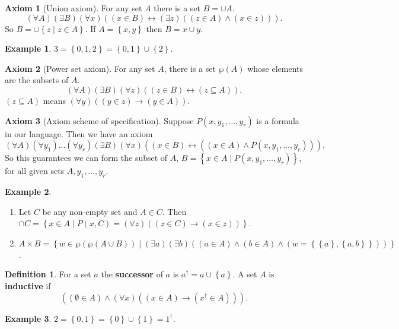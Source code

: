 \documentclass{article}
\newcommand{\rb}[1]{\left( #1 \right)}
\newcommand{\cb}[1]{\left\{ #1 \right\}}
\newcommand{\andb}[2]{\rb{#1 \land #2}}
\newcommand{\impb}[2]{\rb{#1 \rightarrow #2}}
\newcommand{\iffb}[2]{\rb{#1 \leftrightarrow #2}}
\newcommand{\fab}[1]{\rb{\forall #1}}
\newcommand{\teb}[1]{\rb{\exists #1}}
\newcommand{\eqb}[2]{\rb{#1 = #2}}
\newcommand{\inb}[2]{\rb{#1 \in #2}}
\newcommand{\subb}[2]{\rb{#1 \subseteq #2}}
\theoremstyle{definition}\newtheorem{definition}{Definition}[subsection]
\theoremstyle{definition}\newtheorem{remark}[definition]{Remark}
\theoremstyle{definition}\newtheorem*{example}{Example}
\theoremstyle{definition}\newtheorem*{note}{Note}
\newtheorem{axiom}{Axiom}
\begin{document}
\begin{axiom}[Union axiom]
For any set $ A $ there is a set $ B = \cup A $.
$$ \fab{A}\teb{B}\fab{x}\iffb{\inb{x}{B}}{\teb{z}\andb{\inb{z}{A}}{\inb{x}{z}}}. $$
So $ B = \cup \cb{z \mid z \in A} $. If $ A = \cb{x, y} $ then $ B = x \cup y $.
\end{axiom}

\begin{example}
$ 3 = \cb{0, 1, 2} = \cb{0, 1} \cup \cb{2} $.
\end{example}

\begin{axiom}[Power set axiom]
For any set $ A $, there is a set $ \wp\rb{A} $ whose elements are the subsets of $ A $.
$$ \fab{A}\teb{B}\fab{z}\iffb{\inb{z}{B}}{\subb{z}{A}}. $$
$ \subb{z}{A} $ means $ \fab{y}\impb{\inb{y}{z}}{\inb{y}{A}} $.
\end{axiom}

\begin{axiom}[Axiom scheme of specification]
Suppose $ P\rb{x, y_1, \dots, y_r} $ is a formula in our language. Then we have an axiom
$$ \fab{A}\fab{y_1} \dots \fab{y_r}\teb{B}\fab{x}\iffb{\inb{x}{B}}{\andb{\inb{x}{A}}{P\rb{x, y_1, \dots, y_r}}}. $$
So this guarantees we can form the subset of $ A $, $ B = \cb{x \in A \mid P\rb{x, y_1, \dots, y_r}} $, for all given sets $ A, y_1, \dots, y_r $.
\end{axiom}

\begin{example}
\hfill
\begin{enumerate}
\item Let $ C $ be any non-empty set and $ A \in C $. Then $ \cap C = \cb{x \in A \mid P\rb{x, C} = \fab{z}\impb{\inb{z}{C}}{\inb{x}{z}}} $.
\item $ A \times B = \cb{w \in \wp\rb{\wp\rb{A \cup B}} \mid \teb{a}\teb{b}\rb{\inb{a}{A} \land \inb{b}{A} \land \eqb{w}{\cb{\cb{a}, \cb{a, b}}}}} $.
\end{enumerate}
\end{example}

\begin{definition}
For a set $ a $ the \textbf{successor} of $ a $ is $ a^\dagger = a \cup \cb{a} $. A set $ A $ is \textbf{inductive} if
$$ \andb{\inb{\emptyset}{A}}{\fab{x}\impb{\inb{x}{A}}{\inb{x^\dagger}{A}}}. $$
\end{definition}

\begin{example}
$ 2 = \cb{0, 1} = \cb{0} \cup \cb{1} = 1^\dagger $.
\end{example}
\end{document}
